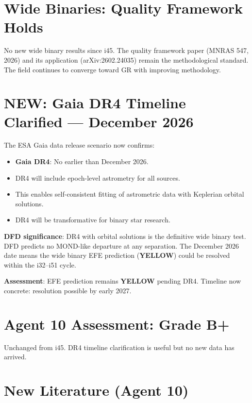 \documentclass[11pt,a4paper]{article}
\newcommand{\YELLOW}{\textcolor{dfdyellow}{\textbf{YELLOW}}}
\newcommand{\NEW}{\textcolor{dfdblue}{\textbf{NEW}}}
\begin{document}
\section{Wide Binaries: Quality Framework Holds}

No new wide binary results since i45. The quality framework paper (MNRAS 547, 2026) and its application (arXiv:2602.24035) remain the methodological standard. The field continues to converge toward GR with improving methodology.

\section{\NEW: Gaia DR4 Timeline Clarified --- December 2026}

\begin{tcolorbox}[colback=blue!5!white, colframe=blue!60!black,
  title={Gaia DR4: No Earlier Than December 2026}]

The ESA Gaia data release scenario now confirms:
\begin{itemize}
\item \textbf{Gaia DR4}: No earlier than December 2026.
\item DR4 will include epoch-level astrometry for all sources.
\item This enables self-consistent fitting of astrometric data with Keplerian orbital solutions.
\item DR4 will be transformative for binary star research.
\end{itemize}

\textbf{DFD significance}: DR4 with orbital solutions is the definitive wide binary test. DFD predicts no MOND-like departure at any separation. The December 2026 date means the wide binary EFE prediction (\YELLOW) could be resolved within the i32--i51 cycle.

\textbf{Assessment}: EFE prediction remains \YELLOW{} pending DR4. Timeline now concrete: resolution possible by early 2027.
\end{tcolorbox}

\section{Agent 10 Assessment: Grade B+}

Unchanged from i45. DR4 timeline clarification is useful but no new data has arrived.

\section{New Literature (Agent 10)}
\end{document}
